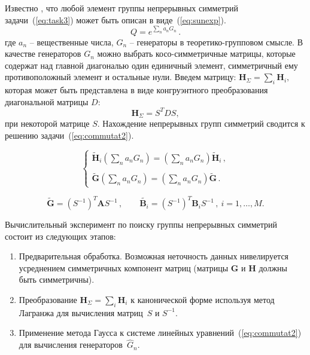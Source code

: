 Известно , что любой элемент группы непрерывных симметрий задачи~(\ref{eq:task3}) может быть описан в виде~(\ref{eq:sunexp}).
\begin{equation}
\label{eq:sunexp}
Q=e^{\sum\limits_n a_n G_n} \, .
\end{equation}
где $a_n$ -- вещественные числа, $G_n$ -- генераторы в теоретико-групповом смысле. В качестве генераторов $G_n$ можно выбрать косо-симметричные матрицы, которые содержат над главной диагональю один единичный элемент, симметричный ему противоположный элемент и остальные нули.
Введем матрицу: $ {\textbf{H}}_{\Sigma} = \sum_{i} \textbf{H}_i,$ которая может быть представлена в виде конгруэнтного преобразования диагональной матрицы $D$:
$${\textbf{H}}_{\Sigma} = S^TDS,$$
при некоторой матрице $S$.
Нахождение непрерывных групп симметрий сводится к решению задачи~(\ref{eq:commutat2}).

\begin{equation}
\label{eq:commutat2}
\left\{
\begin{array}{l}
\displaystyle
\tilde{\textbf{H}}_i \left(\sum\limits_na_nG_n\right) =
\left(\sum\limits_na_nG_n\right)\tilde{\textbf{H}}_i \, , \\ \\
\displaystyle
\tilde{\textbf{G}} \left(\sum\limits_na_nG_n\right) = \left(\sum\limits_na_nG_n\right)\tilde{\textbf{G}} \, .
\end{array}
\right.
\end{equation}

\begin{equation}
\tilde{\textbf{G}}=\left(S^{-1}\right)^T \textbf{A} S^{-1} \, , \qquad
\tilde{\textbf{B}_i}=\left(S^{-1}\right)^T \textbf{B}_i S^{-1} \, , \ i=1,\dots,M.
\end{equation}

Вычислительный эксперимент по поиску группы непрерывных симметрий состоит из следующих этапов:
\begin{enumerate}
  \item Предварительная обработка. Возможная неточность данных нивелируется усреднением симметричных компонент матриц (матрицы $\textbf{G}$ и $\textbf{H}$ должны быть симметричны).
  \item %
  Преобразование $ {\textbf{H}}_{\Sigma} = \sum_{i} \textbf{H}_i$ к канонической форме используя метод Лагранжа для вычисления матриц~$S$ и $S^{-1} $.
  \item Применение метода Гаусса к системе линейных уравнений~(\ref{eq:commutat2}) для вычисления генераторов~$\hat{G}_n$.
\end{enumerate}

